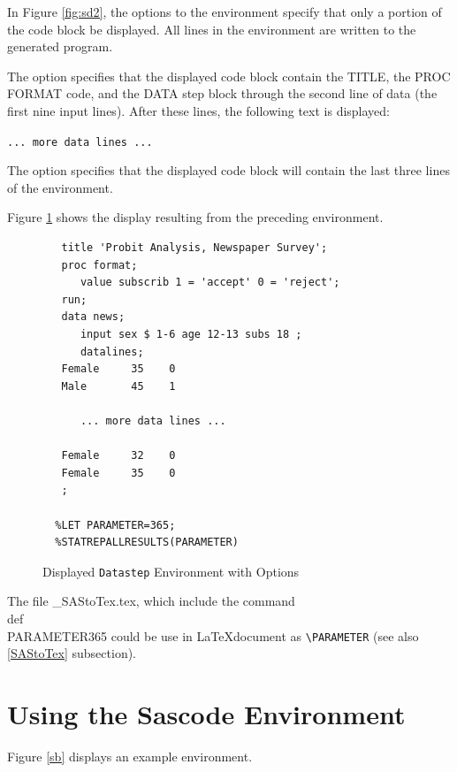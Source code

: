 \documentclass[article,oneside]{memoir}
\begin{document}
  In Figure \ref{fig:sd2}, the options to the  environment specify that only a portion
  of the code block be displayed.  All lines in the environment are written to the
  generated program.

  The option  specifies that the displayed code
  block contain the TITLE, the PROC FORMAT code, and the DATA step block through the
  second line of data (the first nine input lines). After these lines, the
  following text is displayed:\par\texttt{... more data lines ...}

  The option  specifies that the displayed code block
  will contain the last three lines of the environment.

  Figure \ref{fig:sd3} shows the display resulting from the preceding
 environment.
\begin{figure}[H]
\begin{snugshade}
\begin{verbatim}
   title 'Probit Analysis, Newspaper Survey';
   proc format;
      value subscrib 1 = 'accept' 0 = 'reject';
   run;
   data news;
      input sex $ 1-6 age 12-13 subs 18 ;
      datalines;
   Female     35    0
   Male       45    1

      ... more data lines ...

   Female     32    0
   Female     35    0
   ;
   
  %LET PARAMETER=365;
  %STATREPALLRESULTS(PARAMETER)
\end{verbatim}
\end{snugshade}
\caption{Displayed \texttt{Datastep} Environment with Options}\label{fig:sd3}
\end{figure}

The file \_SAStoTex.tex, which include the command \\def\\PARAMETER{365} could be use in \LaTeX document as \verb|\PARAMETER| (see also \ref{SAStoTex} subsection).



\section{Using the Sascode Environment}\label{scex}
Figure \ref{sb} displays an example  environment.
\end{document}
